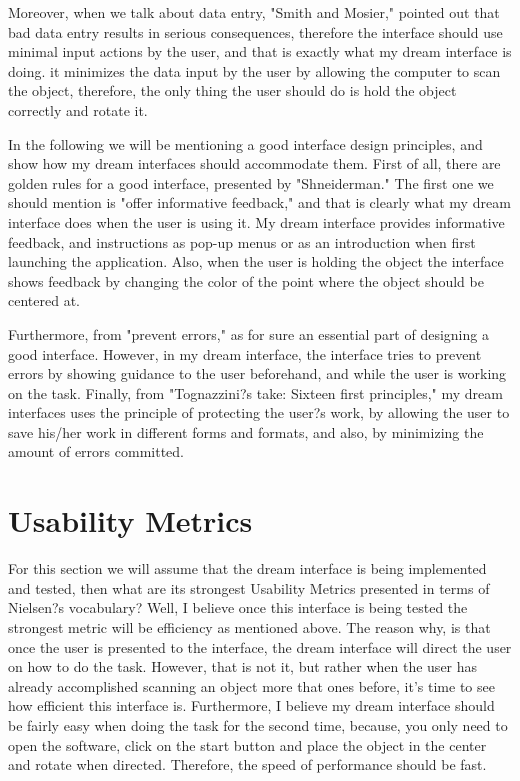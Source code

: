 \documentclass[12pt, oneside]{amsart}   	%
\begin{document}
Moreover, when we talk about data entry, "Smith and Mosier," pointed out that bad data entry results in serious consequences, therefore the interface should use minimal input actions by the user, and that is exactly what my dream interface is doing. it minimizes the data input by the user by allowing the computer to scan the object, therefore, the only thing the user should do is hold the object correctly and rotate it. 

In the following we will be mentioning a good interface design principles, and show how my dream interfaces should accommodate them.  First of all, there are golden rules for a good interface, presented by "Shneiderman."  The first one we should mention is "offer informative feedback," and that is clearly what my dream interface does when the user is using it.  My dream interface provides informative feedback, and instructions as pop-up menus or as an introduction when first launching the application.  Also, when the user is holding the object the interface shows feedback by changing the color of the point where the object should be centered at. 

Furthermore, from "prevent errors," as for sure an essential part of designing a good interface.  However, in my dream interface, the interface tries to prevent errors by showing guidance to the user beforehand, and while the user is working on the task.  Finally, from "Tognazzini?s take: Sixteen first principles," my dream interfaces uses the principle of protecting the user?s work, by allowing the user to save his/her work in different forms and formats, and also, by minimizing the amount of errors committed.

\section{Usability Metrics}

For this section we will assume that the dream interface is being implemented and tested, then what are its strongest Usability Metrics presented in terms of Nielsen?s vocabulary?  Well, I believe once this interface is being tested the strongest metric will be efficiency as mentioned above.  The reason why, is that once the user is presented to the interface, the dream interface will direct the user on how to do the task.  However, that is not it, but rather when the user has already accomplished scanning an object more that ones before, it's time to see how efficient this interface is.  Furthermore, I believe my dream interface should be fairly easy when doing the task for the second time, because, you only need to open the software, click on the start button and place the object in the center and rotate when directed.  Therefore, the speed of performance should be fast.
\end{document}
